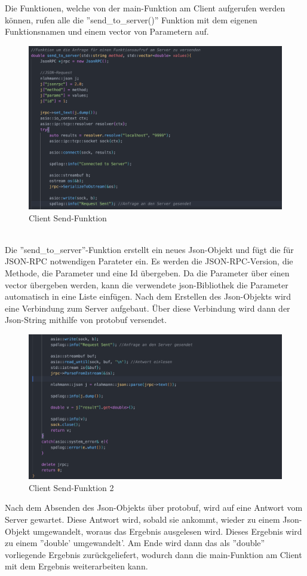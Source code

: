 \documentclass[german,oneside,color]{htldipl}
\begin{document}
Die Funktionen, welche von der main-Funktion am Client aufgerufen werden können, rufen alle die ''send\_to\_server()'' Funktion mit dem eigenen Funktionsnamen und einem vector von Parametern auf. 
\\
\begin{figure}[h!]
  \centering
  \includegraphics[width=1\textwidth]{images/Client_send.png}
  \caption{Client Send-Funktion}
  \label{Client_main}
\end{figure}   
\\
Die ''send\_to\_server''-Funktion erstellt ein neues Json-Objekt und fügt die für JSON-RPC notwendigen Parateter ein. Es werden die JSON-RPC-Version, die Methode, die Parameter und eine Id übergeben. Da die Parameter über einen vector übergeben werden, kann die verwendete json-Bibliothek die Parameter automatisch in eine Liste einfügen. Nach dem Erstellen des Json-Objekts wird eine Verbindung zum Server aufgebaut. Über  diese Verbindung wird dann der Json-String mithilfe von protobuf versendet. 
\\
\newpage
\begin{figure}[h!]
  \centering
  \includegraphics[width=1\textwidth]{images/Client_receive.png}
  \caption{Client Send-Funktion 2}
  \label{Cient_receive}
\end{figure}   
Nach dem Absenden des Json-Objekts über protobuf, wird auf eine Antwort vom Server gewartet. Diese Antwort wird, sobald sie ankommt, wieder zu einem Json-Objekt umgewandelt, woraus das Ergebnis ausgelesen wird. Dieses Ergebnis wird zu einem ''double' umgewandelt'. Am Ende wird dann das als ''double'' vorliegende Ergebnis zurückgeliefert, wodurch dann die main-Funktion am Client mit dem Ergebnis weiterarbeiten kann.
\end{document}
